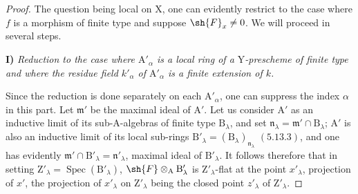 \begin{proof}
The question being local on $\mathrm{X}$, one can evidently restrict to the case where $f$ is
a morphism of finite type and suppose $\sh{F}_x\neq 0$. We will proceed in several steps.

\medskip
\noindent\textbf{I)} \emph{Reduction to the case where $\mathrm{A}'_\alpha$ is a local ring of a $\mathrm{Y}$-prescheme of finite type and where the
residue field $k'_\alpha$ of $\mathrm{A}'_\alpha$ is a finite extension of $k$.}

\medskip
Since the reduction is done separately on each $\mathrm{A}'_\alpha$, one can suppress the index $\alpha$ in
this part. Let $\mathfrak{m}'$ be the maximal ideal of $\mathrm{A}'$. Let us consider $\mathrm{A}'$ as an
inductive limit of its sub-$\mathrm{A}$-algebras of finite type $\mathrm{B}_\lambda$, and set $\mathfrak{n}_\lambda=\mathfrak{m}'\cap\mathrm{B}_\lambda$; $\mathrm{A}'$ is also an
inductive limit of its local sub-rings $\mathrm{B}'_\lambda=(\mathrm{B}_\lambda)_{\mathfrak{n}_\lambda}$ $(5.13.3)$, and one has evidently
$\mathfrak{m}'\cap\mathrm{B}'_\lambda=\mathfrak{n}'_\lambda$, maximal ideal of $\mathrm{B}'_\lambda$. It follows therefore  that in
setting $\mathrm{Z}'_\lambda=\operatorname{Spec}(\mathrm{B}'_\lambda)$, $\sh{F}\otimes_\mathrm{A}\mathrm{B}'_\lambda$ is $\mathrm{Z}'_\lambda$-flat at the point $x'_\lambda$, projection of $x'$, the projection
of $x'_\lambda$ on $\mathrm{Z}'_\lambda$ being the closed point $z'_\lambda$ of $\mathrm{Z}'_\lambda$.


\end{proof}

